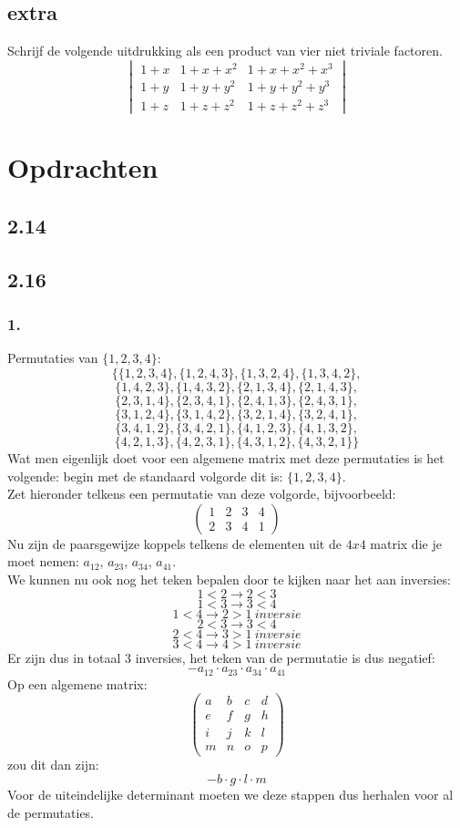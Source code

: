 \documentclass[10pt,a4paper]{article}
\begin{document}
\subsection*{extra}
Schrijf de volgende uitdrukking als een product van vier niet triviale factoren.
\[
\begin{vmatrix}
1+x & 1+x+x^{2} & 1+x+x^{2}+x^{3}\\
1+y & 1+y+y^{2} & 1+y+y^{2}+y^{3}\\
1+z & 1+z+z^{2} & 1+z+z^{2}+z^{3}
\end{vmatrix}
\]

\section{Opdrachten}
\subsection*{2.14}
\subsection*{2.16}
\subsubsection*{1.}
Permutaties van $\{1,2,3,4\}$:
$$
\{\{1, 2, 3, 4\}, \{1, 2, 4, 3\}, \{1, 3, 2, 4\}, \{1, 3, 4, 2\},$$
$$ \{1, 4, 2, 3\}, \{1, 4, 3, 2\}, \{2, 1, 3, 4\}, \{2, 1, 4, 3\}, $$ 
$$\{2, 3, 1, 4\}, \{2, 3, 4, 1\}, \{2, 4, 1, 3\}, \{2, 4, 3, 1\}, $$
$$\{3, 1, 2, 4\}, \{3, 1, 4, 2\}, \{3, 2, 1, 4\}, \{3, 2, 4, 1\}, $$ $$
\{3, 4, 1, 2\}, \{3, 4, 2, 1\}, \{4, 1, 2, 3\}, \{4, 1, 3, 2\}, $$
$$\{4, 2, 1, 3\}, \{4, 2, 3, 1\}, \{4, 3, 1, 2\}, \{4, 3, 2, 1\}\}
$$
Wat men eigenlijk doet voor een algemene matrix met deze permutaties is het volgende: begin met de standaard volgorde dit is: $\{1,2,3,4\}$.\\ Zet hieronder telkens een permutatie van deze volgorde, bijvoorbeeld:
$$\begin{pmatrix}
1 & 2 & 3 & 4\\
2 & 3 & 4 & 1
\end{pmatrix}
$$
Nu zijn de paarsgewijze koppels telkens de elementen uit de $4x4$ matrix die je moet nemen: $a_{12}$, $a_{23}$, $a_{34}$, $a_{41}$.\\
We kunnen nu ook nog het teken bepalen door te kijken naar het aan inversies:\\
$$1 < 2 \rightarrow 2 < 3$$
$$1 < 3 \rightarrow 3 < 4$$
$$1 < 4 \rightarrow 2 > 1 \ inversie$$
$$2 < 3 \rightarrow 3 < 4$$
$$2 < 4 \rightarrow 3 > 1 \ inversie$$
$$3 < 4 \rightarrow 4 > 1 \ inversie$$
Er zijn dus in totaal 3 inversies, het teken van de permutatie is dus negatief:
$$-a_{12}\cdot a_{23}\cdot a_{34}\cdot a_{41}$$
Op een algemene matrix:
$$
\begin{pmatrix}
a & b & c & d\\
e & f & g & h\\
i & j & k & l\\
m & n & o & p
\end{pmatrix}
$$
zou dit dan zijn:
$$-b\cdot g\cdot l\cdot m$$
Voor de uiteindelijke determinant moeten we deze stappen dus herhalen voor al de permutaties.
\end{document}
